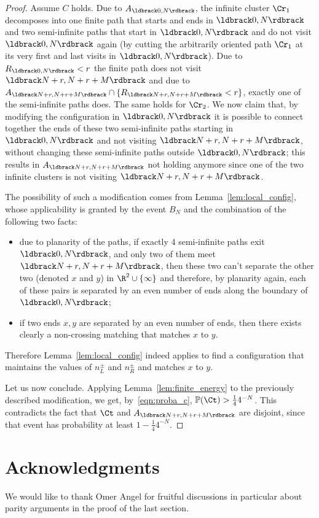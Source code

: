 \documentclass[12pt]{amsart}
\newcommand{\prob}{\mathbb{P}}
\theoremstyle{remark}
\newcommand{\Li}{\ldbrack} %
\newcommand{\Ri}{\rdbrack}
\begin{document}
\begin{proof}
Assume $C$ holds. Due to $A_{\Li0,N\Ri}$, the infinite cluster $\Cr_1$ decomposes into one finite path that starts and ends in $\Li0,N\Ri$  and two semi-infinite paths that start in $\Li0,N\Ri$ and do not visit $\Li0,N\Ri$ again (by cutting the arbitrarily oriented path $\Cr_1$ at its very first and last visits in $\Li0,N\Ri$). Due to $R_{\Li 0,N\Ri}<r$ 
 the finite path does not visit $\Li N+r,N+r+M\Ri$ and due to $A_{\Li N+r,N+r+M\Ri}\cap\{R_{\Li N+r,N+r+M\Ri}<r\}$, exactly one of the semi-infinite paths does. 
The same holds for $\Cr_2$. We now claim that, by modifying the configuration in $\Li0,N\Ri$ it is possible to connect together the ends of these two semi-infinite paths starting in $\Li0,N\Ri$ and not visiting $\Li N+r,N+r+M\Ri$, without changing these semi-infinite paths outside $\Li0,N\Ri$; this results in $A_{\Li N+r,N+r+M\Ri}$ not holding anymore since one of the two infinite clusters is not visiting $\Li N+r,N+r+M\Ri$. 



The possibility of such a modification comes from Lemma~\ref{lem:local_config}, whose applicability is granted by the event $B_N$ and the combination of the following two facts: 
\begin{itemize}
	\item due to planarity of the paths,
if exactly 4 semi-infinite paths exit $\Li0,N\Ri$, and only two of them meet $\Li N+r,N+r+M\Ri$, then these two can't separate the other two (denoted $x$ and $y$) in $\R^2\cup\{\infty\}$ 
and therefore, by planarity again, each of these pairs is separated by an even number of ends along the boundary of $\Li0,N\Ri$; 
	\item if two ends $x,y$ are separated by an even number of ends, then there exists clearly a non-crossing matching that matches $x$ to $y$. 
\end{itemize}

Therefore Lemma~\ref{lem:local_config} indeed applies to find a configuration that maintains the values of $n^\pm_L$ and $n^\pm_R$ and matches $x$ to $y$. 

\smallskip
Let us now conclude. Applying Lemma~\ref{lem:finite_energy} to the previously described modification, we get, by~\eqref{eqn:proba_c}, $\prob(\Ct)>\frac144^{-N}$. This contradicts the fact that $\Ct$ and $A_{\Li N+r,N+r+M\Ri}$ are disjoint, since that event has probability at least $1-\frac144^{-N}$. 
\end{proof}

\vspace{-.2cm} %

\section*{Acknowledgments}

We would like to thank Omer Angel for fruitful discussions in particular about parity arguments in the proof of the last section. 

\vspace{-.2cm} %



\end{document}
